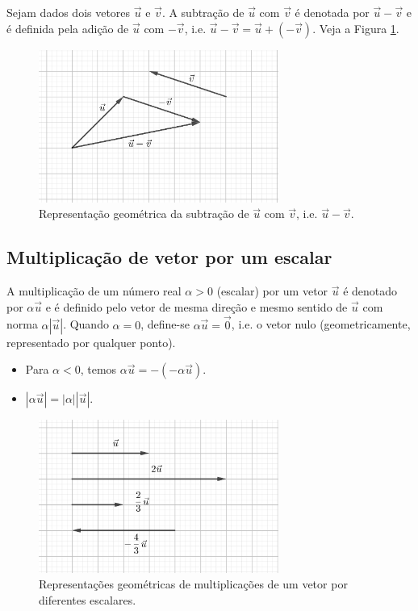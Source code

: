 Sejam dados dois vetores $\vec{u}$ e $\vec{v}$. A subtração de $\vec{u}$ com $\vec{v}$ é denotada por $\vec{u}-\vec{v}$ e é definida pela adição de $\vec{u}$ com $-\vec{v}$, i.e. $\vec{u}-\vec{v}=\vec{u}+(-\vec{v})$. Veja a Figura \ref{fig:vsubtracao}.

\begin{figure}[h!]
  \centering
  \includegraphics[width=0.7\textwidth]{./cap_vetor/dados/fig_vsubtracao/fig_vsubtracao}
  \caption{Representação geométrica da subtração de $\vec{u}$ com $\vec{v}$, i.e. $\vec{u}-\vec{v}$.}
  \label{fig:vsubtracao}
\end{figure}

\subsection{Multiplicação de vetor por um escalar}

A multiplicação de um número real $\alpha>0$ (escalar) por um vetor $\vec{u}$ é denotado por $\alpha\vec{u}$ e é definido pelo vetor de mesma direção e mesmo sentido de $\vec{u}$ com norma $\alpha|\vec{u}|$. Quando $\alpha = 0$, define-se $\alpha\vec{u}=\vec{0}$, i.e. o vetor nulo (geometricamente, representado por qualquer ponto).

\begin{obs}
  \begin{itemize}
  \item Para $\alpha<0$, temos $\alpha\vec{u} = -(-\alpha\vec{u})$.
  \item $|\alpha\vec{u}|=|\alpha||\vec{u}|$.
\end{itemize}
\end{obs}

\begin{figure}[h!]
  \centering
  \includegraphics[width=0.7\textwidth]{./cap_vetor/dados/fig_vescalar/fig_vescalar}
  \caption{Representações geométricas de multiplicações de um vetor por diferentes escalares.}
  \label{fig:vescalar}
\end{figure}


